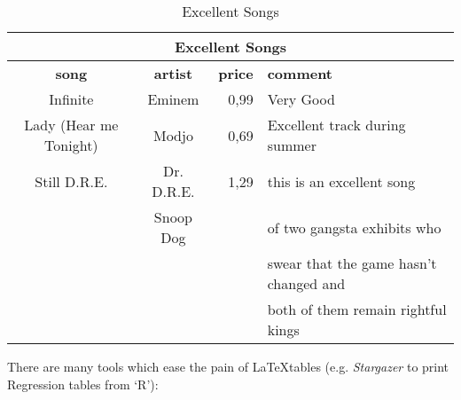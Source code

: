 \documentclass[a4paper]{scrartcl}
\begin{document}
	\begin{table}
		\caption{Excellent Songs}
	\begin{tabular}{|c|c|r|l|}
		\hline
		\multicolumn{4}{|c|}{\textbf{Excellent Songs}} \\
		\hline \hline
		\textbf{song}&\textbf{artist}&\textbf{price}&\textbf{comment} \\
		\hline
		Infinite&Eminem&0,99&Very Good \\
		\hline
		Lady (Hear me Tonight)&Modjo&0,69&Excellent track during summer \\
		\hline
		Still D.R.E.&Dr. D.R.E.&1,29&this is an excellent song \\
		&Snoop Dog&&of two gangsta exhibits who\\
		&&&swear that the game hasn't changed and\\
		&&& both of them remain rightful kings\\
		\hline
	\end{tabular}
	\end{table}
	
	There are many tools which ease the pain of \LaTeX tables (e.g. \emph{Stargazer} to print Regression tables from `R'):
	
\end{document}
